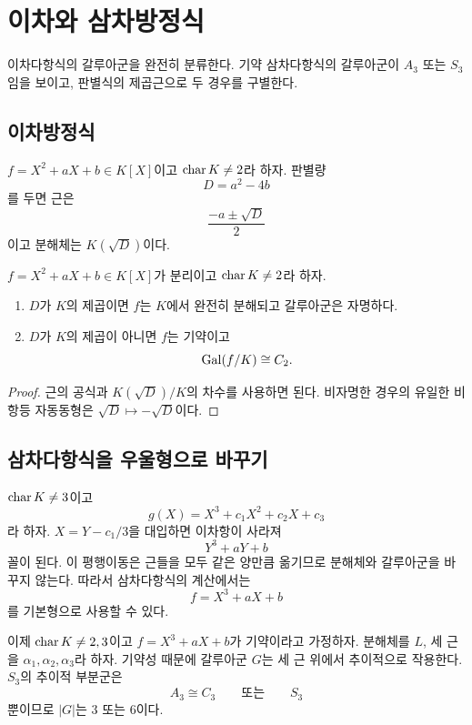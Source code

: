 \clearpage
\section{이차와 삼차방정식}
\label{sec:quadratic-cubic-galois-groups}

\begin{learninggoal}
이차다항식의 갈루아군을 완전히 분류한다. 기약 삼차다항식의 갈루아군이 $A_3$ 또는 $S_3$임을 보이고, 판별식의 제곱근으로 두 경우를 구별한다.
\end{learninggoal}

\subsection{이차방정식}

$f=X^2+aX+b\in K[X]$이고 $\operatorname{char} K\ne2$라 하자. 판별량
\[
  D=a^2-4b
\]
를 두면 근은
\[
  \frac{-a\pm\sqrt D}{2}
\]
이고 분해체는 $K(\sqrt D)$이다.

\begin{proposition}
$f=X^2+aX+b\in K[X]$가 분리이고 $\operatorname{char} K\ne2$라 하자.
\begin{enumerate}[label=(\roman*)]
  \item $D$가 $K$의 제곱이면 $f$는 $K$에서 완전히 분해되고 갈루아군은 자명하다.
  \item $D$가 $K$의 제곱이 아니면 $f$는 기약이고
  \[
    \operatorname{Gal}(f/K)\cong C_2.
  \]
\end{enumerate}
\end{proposition}

\begin{proof}
근의 공식과 $K(\sqrt D)/K$의 차수를 사용하면 된다. 비자명한 경우의 유일한 비항등 자동동형은 $\sqrt D\mapsto-\sqrt D$이다.
\end{proof}

\subsection{삼차다항식을 우울형으로 바꾸기}

$\operatorname{char} K\ne3$이고
\[
  g(X)=X^3+c_1X^2+c_2X+c_3
\]
라 하자. $X=Y-c_1/3$을 대입하면 이차항이 사라져
\[
  Y^3+aY+b
\]
꼴이 된다. 이 평행이동은 근들을 모두 같은 양만큼 옮기므로 분해체와 갈루아군을 바꾸지 않는다. 따라서 삼차다항식의 계산에서는
\[
  f=X^3+aX+b
\]
를 기본형으로 사용할 수 있다.

이제 $\operatorname{char} K\ne2,3$이고 $f=X^3+aX+b$가 기약이라고 가정하자. 분해체를 $L$, 세 근을 $\alpha_1,\alpha_2,\alpha_3$라 하자. 기약성 때문에 갈루아군 $G$는 세 근 위에서 추이적으로 작용한다. $S_3$의 추이적 부분군은
\[
  A_3\cong C_3
  \qquad\text{또는}\qquad
  S_3
\]
뿐이므로 $|G|$는 $3$ 또는 $6$이다.

